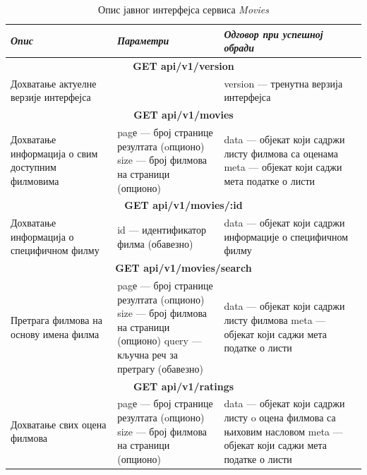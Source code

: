 \documentclass[12pt,oneside]{memoir}
\begin{document}
\begin{table}
\caption{Опис јавног интерфејса сервиса  \textit{Movies} }
\label{tbl:moviesAPI}
\begin{center}
\begin{tabular}{ |  p{0.3\linewidth} | p{0.3\linewidth}|  p{0.4\linewidth} | }
 
 \hline
  \textit{Опис} & \textit{Параметри} & \textit{Одговор при успешној обради} \\
  \hline
  \multicolumn{3}{|c|}{\textbf{GET api/v1/version}} \\
  \hline
  Дохватање актуелне верзије интерфејса
  & 
  
  & 
 version --- тренутна верзија интерфејса \\
  \hline
 \multicolumn{3}{|c|}{\textbf{GET api/v1/movies}} \\
  \hline
  Дохватање информација о свим доступним филмовима
  & 
  pagе --- број странице резултата (oпционо) \newline 
  size --- број филмова на страници (опционо)
  & 
  data --- објекат који садржи листу филмова са оценама \newline  
  meta --- објекат који саджи мета податке о листи \\
  \hline
   \multicolumn{3}{|c|}{\textbf{GET api/v1/movies/:id}} \\
  \hline
  Дохватање информација о специфичном филму 
  & 
  id --- идентификатор филма (обавезно)
  & 
  data --- објекат који садржи информације о специфичном филму\\
  \hline
   \multicolumn{3}{|c|}{\textbf{GET api/v1/movies/search}} \\
  \hline
  Претрага филмова на основу имена филма
  & 
  pagе --- број странице резултата (oпционо) \newline 
  size --- број филмова на страници (опционо) \newline 
  query --- кључна реч за претрагу (обавезно)
  & 
  data --- објекат који садржи листу филмова \newline  
  meta --- објекат који саджи мета податке о листи \\
   \hline
     \multicolumn{3}{|c|}{\textbf{GET api/v1/ratings}} \\
  \hline
 Дохватање свих оцена филмова
  & 
  pagе --- број странице резултата (oпционо) \newline 
  size --- број филмова на страници (опционо)
  & 
  data --- објекат који садржи листу o оцена филмова са њиховим насловом \newline 
  meta --- објекат који саджи мета податке о листи \\ 
  \hline
\end{tabular}
\end{center}
\end{table}
\end{document}
